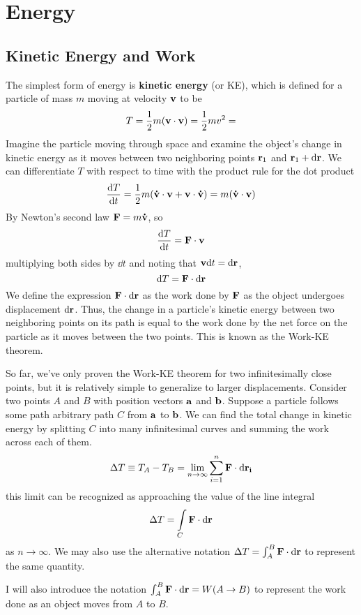 \chapter{Energy}
\section{Kinetic Energy and Work}
The simplest form of energy is \textbf{kinetic energy} (or KE), which is defined for a particle of mass $m$ moving at velocity $\mathbf{v}$ to be
\[ T = \frac{1}{2}m (\mathbf{v}\cdot\mathbf{v}) = \frac{1}{2}mv^2 =  \]
Imagine the particle moving through space and examine the object's change in kinetic energy as it moves between two neighboring points $\mathbf{r}_1$ and $\mathbf{r}_1 + \dd \mathbf{r}$.  We can differentiate $T$ with respect to time with the product rule for the dot product
\[ \dv{T}{t} = \frac{1}{2}m (\mathbf{\dot v} \cdot \mathbf{v} + \mathbf{v}\cdot\mathbf{\dot v}) = m(\mathbf{\dot v}\cdot \mathbf{v})\]
By Newton's second law $\mathbf{F} = m\mathbf{\dot v}$, so
\[ \dv{T}{t} = \mathbf{F} \cdot \mathbf{v} \]
multiplying both sides by $\dd t$ and noting that $\mathbf{v}\dd t = \dd\mathbf{r}$,
\[ \dd T = \mathbf{F} \cdot \dd \mathbf{r} \]
We define the expression $\mathbf{F}\cdot \dd\mathbf{r}$ as the work done by $\mathbf{F}$ as the object undergoes displacement $\dd\mathbf{r}$. Thus, the change in a particle's kinetic energy between two neighboring points on its path is equal to the work done by the net force on the particle as it moves between the two points. This is known as the Work-KE theorem.

So far, we've only proven the Work-KE theorem for two infinitesimally close points, but it is relatively simple to generalize to larger displacements. Consider two points $A$ and $B$ with position vectors $\mathbf{a}$ and $\mathbf{b}$. Suppose a particle follows some path arbitrary path $C$ from $\mathbf{a}$ to $\mathbf{b}$. We can find the total change in kinetic energy by splitting $C$ into many infinitesimal curves and summing the work across each of them.
\[ \Delta T \equiv T_A - T_B = \lim_{n\to\infty} \sum_{i=1}^n \mathbf{F}\cdot \dd \mathbf{r_i} \]
this limit can be recognized as approaching the value of the line integral
\[ \Delta T = \int\limits_C \mathbf{F}\cdot\dd\mathbf{r} \]
as $n\to\infty$. We may also use the alternative notation $\Delta T = \int_A^B\mathbf{F}\cdot\dd\mathbf{r}$ to represent the same quantity. 

I will also introduce the notation $\int_A^B \mathbf{F}\cdot\dd\mathbf{r} = W(A\to B)$ to represent the work done as an object moves from $A$ to $B$. 

